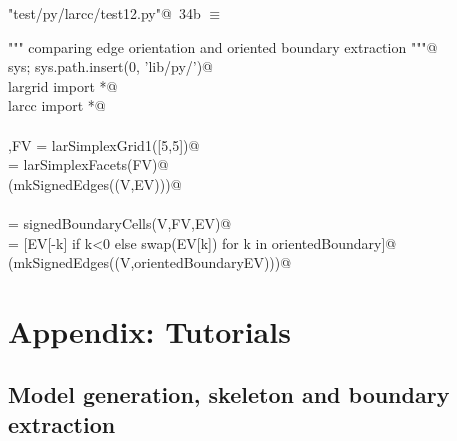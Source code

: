 \documentclass[11pt,oneside]{article}	%
\begin{document}
\begin{flushleft} \small \label{scrap59}
\protect{}\verb@"test/py/larcc/test12.py"@\nobreak\ {\footnotesize 34b }$\equiv$
\vspace{-1ex}
\begin{list}{}{} \item
\mbox{}\verb@""" comparing edge orientation and oriented boundary extraction """@\\
\mbox{}\verb@import sys; sys.path.insert(0, 'lib/py/')@\\
\mbox{}\verb@from largrid import *@\\
\mbox{}\verb@from larcc import *@\\
\mbox{}\verb@@\\
\mbox{}\verb@V,FV = larSimplexGrid1([5,5])@\\
\mbox{}\verb@EV = larSimplexFacets(FV)@\\
\mbox{}\verb@VIEW(mkSignedEdges((V,EV)))@\\
\mbox{}\verb@@\\
\mbox{}\verb@orientedBoundary = signedBoundaryCells(V,FV,EV)@\\
\mbox{}\verb@orientedBoundaryEV = [EV[-k] if k<0 else swap(EV[k]) for k in orientedBoundary]@\\
\mbox{}\verb@VIEW(mkSignedEdges((V,orientedBoundaryEV)))@\\
\mbox{}\verb@@{\NWsep}
\end{list}
\vspace{-2ex}
\end{flushleft}



\appendix

\section{Appendix: Tutorials}


\subsection{Model generation, skeleton and boundary extraction}
\end{document}
